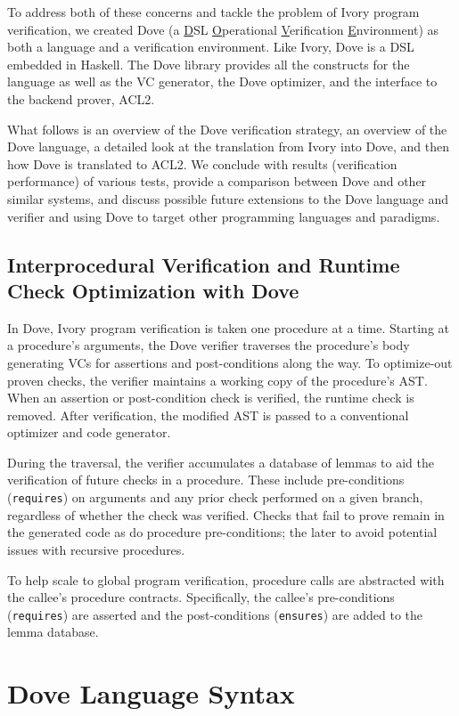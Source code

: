 \documentclass{article}
\begin{document}
To address both of these concerns and tackle the problem of Ivory program
verification, we created Dove (a \underline{D}SL \underline{O}perational \underline{V}erification \underline{E}nvironment)
as both a language and a verification environment.  Like Ivory,
Dove is a DSL embedded in Haskell.  The Dove library provides all the 
constructs for the language as well as the VC generator, the Dove optimizer,
and the interface to the backend prover, ACL2.

What follows is an overview of the Dove verification strategy,
an overview of the Dove language, a detailed look at the translation from
Ivory into Dove, and then how Dove is translated to ACL2.
We conclude with results (verification performance) of various tests,
provide a comparison between Dove and other similar systems,
and discuss possible future extensions
to the Dove language and verifier and using Dove to target other programming
languages and paradigms.

\subsection{Interprocedural Verification and Runtime Check Optimization with Dove}

In Dove, Ivory program verification is taken one procedure at a time.
Starting at a procedure's arguments, the Dove verifier traverses
the procedure's body generating VCs for assertions and post-conditions along the way.
To optimize-out proven checks, the verifier maintains a working copy of the procedure's AST.
When an assertion or post-condition check is verified, the runtime check is removed.
After verification, the modified AST is passed to a conventional optimizer and code generator.

During the traversal, the verifier accumulates a database of lemmas
to aid the verification of future checks in a procedure.
These include pre-conditions ({\tt requires}) on arguments
and any prior check performed on a given branch, regardless of whether the check was verified.
Checks that fail to prove remain in the generated code
as do procedure pre-conditions; the later to avoid potential issues with
recursive procedures.

To help scale to global program verification,
procedure calls are abstracted with the callee's procedure contracts.
Specifically, the callee's pre-conditions ({\tt requires}) are asserted
and the post-conditions ({\tt ensures}) are added to the lemma database.

\section{Dove Language Syntax}
\end{document}
